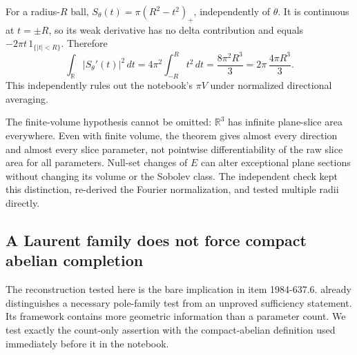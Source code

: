 \begin{example}\ours
For a radius-\(R\) ball,
\(S_\theta(t)=\pi(R^2-t^2)_+\), independently of \(\theta\).
It is continuous at \(t=\pm R\), so its weak derivative has no delta contribution and equals
\(-2\pi t\,1_{\{|t|<R\}}\). Therefore
\[
 \int_{\mathbb R}|S_\theta'(t)|^2\,dt
 =4\pi^2\int_{-R}^{R}t^2\,dt
 =\frac{8\pi^2R^3}{3}
 =2\pi\,\frac{4\pi R^3}{3}.
\]
This independently rules out the notebook's \(\pi V\) under normalized directional averaging.
\end{example}

The finite-volume hypothesis cannot be omitted: \(\mathbb R^3\) has infinite plane-slice area everywhere. Even with finite volume, the theorem gives almost every direction and almost every slice parameter, not pointwise differentiability of the raw slice area for all parameters. Null-set changes of \(E\) can alter exceptional plane sections without changing its volume or the Sobolev class. The independent check kept this distinction, re-derived the Fourier normalization, and tested multiple radii directly.

\subsection{A Laurent family does not force compact abelian completion}
\label{dev:laurent}

The reconstruction tested here is the bare implication in item 1984-637.6. \citet[p.84]{adler1982kowalewski} already distinguishes a necessary pole-family test from an unproved sufficiency statement. Its framework contains more geometric information than a parameter count. We test exactly the count-only assertion with the compact-abelian definition used immediately before it in the notebook.


